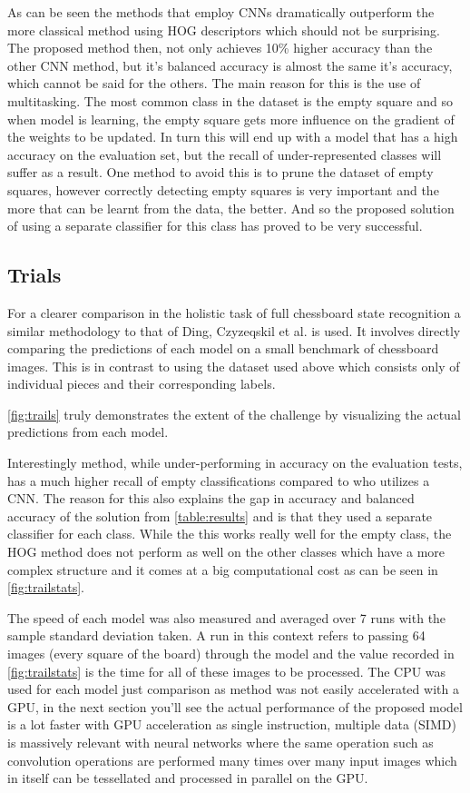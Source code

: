 As can be seen the methods that employ CNNs dramatically outperform the more classical method using HOG descriptors which should not be surprising.  
The proposed method then, not only achieves 10\% higher accuracy than the other CNN method, but it's balanced accuracy is almost the same it's accuracy, 
which cannot be said for the others.  The main reason for this is the use of multitasking.  The most common class in the dataset is the empty square and so when 
\cite{} model is learning, the empty square gets more influence on the gradient of the weights to be updated.  In turn this will end up with a model that has a high 
accuracy on the evaluation set, but the recall of under-represented classes will suffer as a result. One method to avoid this is to prune the dataset 
of empty squares, however correctly detecting empty squares is very important and the more that can be learnt from the data, the better. 
And so the proposed solution of using a separate classifier for this class has proved to be very successful.

\subsection{Trials}
For a clearer comparison in the holistic task of full chessboard state recognition a similar methodology 
to that of Ding, Czyzeqskil et al. \cite{Ding2016ChessVisionC, heatmap} is used.  It involves directly comparing the predictions of each model on a small 
benchmark of chessboard images.  This is in contrast to using the dataset used above which consists only of individual pieces and their corresponding labels.

\autoref{fig:trails} truly demonstrates the extent of the challenge by visualizing the actual predictions from each model.

Interestingly \cite{} method, while under-performing in accuracy on the evaluation tests, has a much higher recall of empty classifications compared to \cite{} 
who utilizes a CNN.  The reason for this also explains the gap in accuracy and balanced accuracy of the solution from \autoref{table:results} and is that 
they used a separate classifier for each class.  While the this works really well for the empty class, the HOG method does not perform as well on the other 
classes which have a more complex structure and it comes at a big computational cost as can be seen in \autoref{fig:trailstats}.  

The speed of each model was also measured and averaged over 7 runs with the sample standard deviation taken.  A run in this context refers to passing 64 images 
(every square of the board) through the model and the value recorded in \autoref{fig:trailstats} is the time for all of these images to be processed.
The CPU was used for each model just comparison as \cite{} method was not easily accelerated with a GPU, in the next section you'll see the actual performance 
of the proposed model is a lot faster with GPU acceleration as single instruction, multiple data (SIMD) is massively relevant with neural networks where the same 
operation such as convolution operations are performed many times over many input images which in itself can be tessellated and processed in parallel on the GPU.

